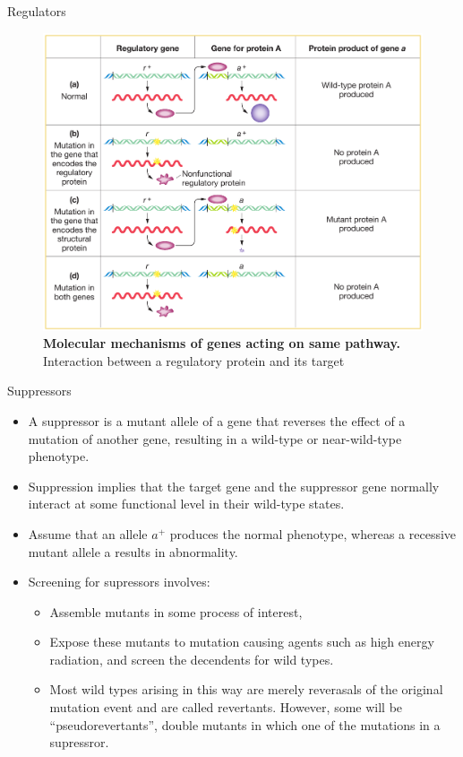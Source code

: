 \documentclass[11pt,dvipsnames,ignorenonframetext,aspectratio=169]{beamer}
\providecommand{\tightlist}{%
  \setlength{\itemsep}{0pt}\setlength{\parskip}{0pt}}
\begin{document}
\begin{frame}{Regulators}
\protect\hypertarget{regulators}{}

\begin{figure}

{\centering \includegraphics[width=0.4\linewidth]{./../images/genes_in_same_pathway_biochemical} 

}

\caption{\textbf{Molecular mechanisms of genes acting on same pathway.} Interaction between a regulatory protein and its target}\label{fig:functional-regulatory-gene}
\end{figure}

\end{frame}

\begin{frame}{Suppressors}
\protect\hypertarget{suppressors}{}

\begin{itemize}
\tightlist
\item
  A suppressor is a mutant allele of a gene that reverses the effect of
  a mutation of another gene, resulting in a wild-type or near-wild-type
  phenotype.
\item
  Suppression implies that the target gene and the suppressor gene
  normally interact at some functional level in their wild-type states.
\item
  Assume that an allele \(a^+\) produces the normal phenotype, whereas a
  recessive mutant allele a results in abnormality.
\item
  Screening for supressors involves:

  \begin{itemize}
  \tightlist
  \item
    Assemble mutants in some process of interest,
  \item
    Expose these mutants to mutation causing agents such as high energy
    radiation, and screen the decendents for wild types.
  \item
    Most wild types arising in this way are merely reverasals of the
    original mutation event and are called revertants. However, some
    will be ``pseudorevertants'', double mutants in which one of the
    mutations in a supressror.
  \end{itemize}
\end{itemize}

\end{frame}
\end{document}
